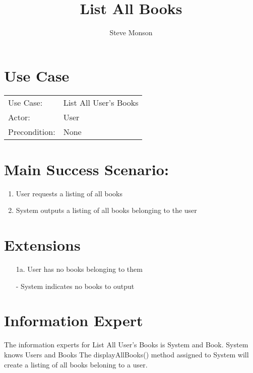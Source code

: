 \documentclass{article}
\title{List All Books}
\author{Steve Monson}
\begin{document}
\maketitle

\section*{Use Case}

\begin{tabular}{l l}
Use Case:     & List All User's Books \\
Actor:        & User \\
Precondition: & None \\
\end{tabular}

\section*{Main Success Scenario:}

\begin{enumerate}
    \item User requests a listing of all books
    \item System outputs a listing of all books belonging to the user
\end{enumerate}

\section*{Extensions}

\begin{itemize}
    \item [1a.] User has no books belonging to them
       
    - System indicates no books to output
\end{itemize}

\section*{Information Expert}

The information experts for List All User's Books is System and Book.
System knows Users and Books
The displayAllBooks() method assigned to System will create a listing of all books beloning to a user.

\pagebreak
\end{document}
